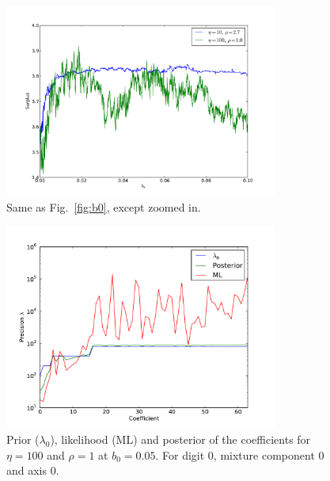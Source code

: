 \documentclass{article}
\begin{document}
\begin{figure}
    \centering
    \includegraphics[width=0.8\textwidth]{figs/surplus45.pdf}
    \caption{Same as Fig.~\ref{fig:b0}, except zoomed in.} \label{fig:b0zoom}
\end{figure}


\begin{figure}
    \centering
    \includegraphics[width=0.8\textwidth]{figs/plotb000-eta100-rho1.pdf}
    \caption{Prior ($\lambda_0$), likelihood (ML) and posterior of the coefficients for $\eta=100$ and $\rho=1$ at $b_0 = 0.05$. For digit 0, mixture component 0 and axis 0.} \label{fig:rho1}
\end{figure}
\end{document}
